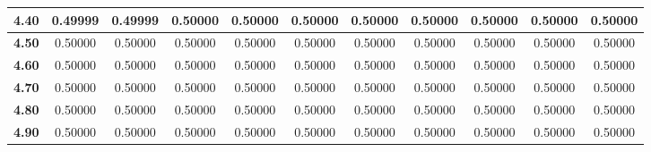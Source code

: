 \begin{tabular}{|c|c|c|c|c|c|c|c|c|c|c|}
\hline
\textbf{ 4.40 } & 0.49999 & 0.49999 & 0.50000 & 0.50000 & 0.50000 & 0.50000 & 0.50000 & 0.50000 & 0.50000 & 0.50000\\ 
\hline
\textbf{ 4.50 } & 0.50000 & 0.50000 & 0.50000 & 0.50000 & 0.50000 & 0.50000 & 0.50000 & 0.50000 & 0.50000 & 0.50000\\ 
\hline
\textbf{ 4.60 } & 0.50000 & 0.50000 & 0.50000 & 0.50000 & 0.50000 & 0.50000 & 0.50000 & 0.50000 & 0.50000 & 0.50000\\ 
\hline
\textbf{ 4.70 } & 0.50000 & 0.50000 & 0.50000 & 0.50000 & 0.50000 & 0.50000 & 0.50000 & 0.50000 & 0.50000 & 0.50000\\ 
\hline
\textbf{ 4.80 } & 0.50000 & 0.50000 & 0.50000 & 0.50000 & 0.50000 & 0.50000 & 0.50000 & 0.50000 & 0.50000 & 0.50000\\ 
\hline
\textbf{ 4.90 } & 0.50000 & 0.50000 & 0.50000 & 0.50000 & 0.50000 & 0.50000 & 0.50000 & 0.50000 & 0.50000 & 0.50000\\ 
\hline
\end{tabular} 

